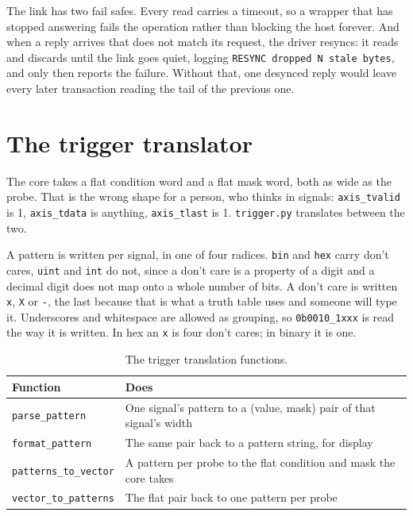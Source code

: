 \documentclass[../manual.tex]{subfiles}
\begin{document}
The link has two fail safes. Every read carries a timeout, so a wrapper that has stopped answering fails the operation rather than blocking the host forever. And when a reply arrives that does not match its request, the driver resyncs: it reads and discards until the link goes quiet, logging \texttt{RESYNC dropped N stale bytes}, and only then reports the failure. Without that, one desynced reply would leave every later transaction reading the tail of the previous one.

\section{The trigger translator}
\label{sec:stack_trigger}

The core takes a flat condition word and a flat mask word, both as wide as the probe. That is the wrong shape for a person, who thinks in signals: \texttt{axis\_tvalid} is 1, \texttt{axis\_tdata} is anything, \texttt{axis\_tlast} is 1. \texttt{trigger.py} translates between the two.

A pattern is written per signal, in one of four radices. \texttt{bin} and \texttt{hex} carry don't cares, \texttt{uint} and \texttt{int} do not, since a don't care is a property of a digit and a decimal digit does not map onto a whole number of bits. A don't care is written \texttt{x}, \texttt{X} or \texttt{-}, the last because that is what a truth table uses and someone will type it. Underscores and whitespace are allowed as grouping, so \texttt{0b0010\_1xxx} is read the way it is written. In hex an \texttt{x} is four don't cares; in binary it is one.

\begin{table}[H]
    \centering
    \begin{tabularx}{\textwidth}{|l|X|}
        \hline
        \rowcolor{gray!40} \textbf{Function} & \textbf{Does} \\
        \hline
        \texttt{parse\_pattern} & One signal's pattern to a (value, mask) pair of that signal's width \\
        \hline
        \texttt{format\_pattern} & The same pair back to a pattern string, for display \\
        \hline
        \texttt{patterns\_to\_vector} & A pattern per probe to the flat condition and mask the core takes \\
        \hline
        \texttt{vector\_to\_patterns} & The flat pair back to one pattern per probe \\
        \hline
    \end{tabularx}
    \caption{The trigger translation functions.}
    \label{tab:stack_trigger}
\end{table}
\end{document}
